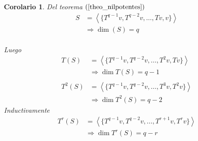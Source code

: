 \documentclass[10pt,a4paper]{article}
\newtheorem{mycorol}{Corolario}
\begin{document}
\begin{mycorol}
	Del teorema $(\ref{theo_nilpotentes})$
	\begin{align*}
		S &= \left<\{T^{q-1}v, T^{q-2}v,\ldots,Tv, v\}\right>\\
		&\Rightarrow\dim (S) = q\\			
	\end{align*}

	Luego 
	\begin{align*}
		T(S) &= \left<\{T^{q-1}v, T^{q-2}v,\ldots,T^{2}v, Tv\}\right>\\
		&\Rightarrow\dim T(S) = q-1\\\\
		T^{2}(S) &= \left<\{T^{q-1}v, T^{q-2}v,\ldots,T^{3}v, T^{2}v\}\right>\\
		&\Rightarrow\dim T^{2}(S) = q-2
	\end{align*}
	Inductivamente 
	\begin{align*}
		T^{r}(S) &= \left<\{T^{q-1}v, T^{q-2}v,\ldots,T^{r+1}v, T^{r}v\}\right>\\
		&\Rightarrow\dim T^{r}(S) = q-r\\			
	\end{align*}
\end{mycorol}
\end{document}
